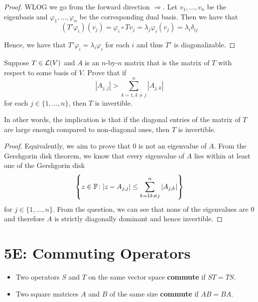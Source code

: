 \documentclass{extarticle}
\begin{document}
\begin{proof}
WLOG we go from the forward direction \(\Rightarrow\). Let \(v_1, \ldots, v_n\) be the eigenbasis and 
\(\varphi_1, \ldots, \varphi_n\) be the corresponding dual basis. Then we have that 
\[(T' \varphi_i)(v_j) = \varphi_i \circ Tv_j = \lambda_j \varphi_i(v_j) = \lambda_i \delta_{ij}\]

Hence, we have that \(T' \varphi_i = \lambda_i \varphi_i\) for each \(i\) and thus \(T'\) is diagonalizable.
\end{proof}

\begin{problem}{22}
    Suppose \(T \in \mathcal{L}(V)\) and \(A\) is an \(n\)-by-\(n\) matrix that is the matrix of \(T\) with respect to some 
    basis of \(V\). Prove that if 
    \[|A_{j,j}| > \sum_{k=1, k\neq j}^{n} |A_{j,k}|\] 
    for each \(j \in \{1, \ldots, n\}\), then \(T\) is invertible. 

    In other words, the implication is that if the diagonal entries of the matrix of \(T\) are large enough 
    compared to non-diagonal ones, then \(T\) is invertible. 
\end{problem}

\begin{proof}
Equivalently, we aim to prove that 0 is not an eigenvalue of \(A\). From the Gershgorin disk theorem, we know 
that every eigenvalue of \(A\) lies within at least one of the Gershgorin disk 
\[\left\{z \in \mathbb{F} \colon |z - A_{j,j}| \leq \sum_{k=1 k \neq j }^{n} |A_{j,k}|\right\}\]
for \(j \in \{1, \ldots, n\}\). From the question, we can see that none of the eigenvalues are 0 and therefore 
\(A\) is strictly diagonally dominant and hence invertible. 
\end{proof}


\newpage 
\section*{5E: Commuting Operators}

\begin{definition}[commute]
    \begin{itemize}
        \item Two operators \(S\) and \(T\) on the same vector space \textbf{commute} if \(ST = TS\).
        \item Two square matrices \(A\) and \(B\) of the same size \textbf{commute} if \(AB = BA\).
    \end{itemize}
\end{definition}
\end{document}
